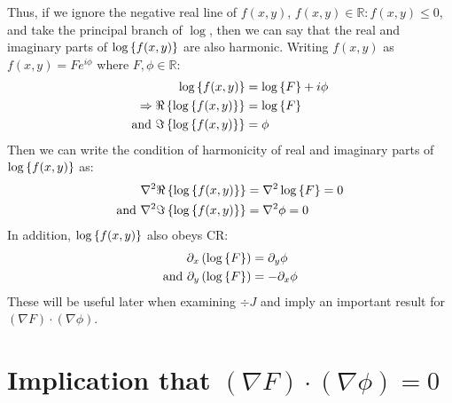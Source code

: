 \documentclass{article}
\begin{document}
Thus, if we ignore the negative real line of $f(x,y)$, $f(x,y) \in \mathbb{R} :
f(x,y) \leq 0$, and take the principal branch of $\log$, then we can say that
the real and imaginary parts of $\log \left\{ f(x,y) \right\}$ are also harmonic. Writing
$f(x,y)$ as $f(x,y) = F e^{i \phi}$ where $F, \phi \in \mathbb{R}$:
\begin{align}
    \log \left\{ f(x,y) \right\} &= \log \left\{ F \right\} + i \phi \\
    \Rightarrow \Re \left\{ \log \left\{ f(x,y) \right\} \right\} &= \log \left\{ F \right\} \\
    \textrm{and} ~ \Im \left\{ \log \left\{ f(x,y) \right\} \right\} &= \phi
\end{align}
Then we can write the condition of harmonicity of real and imaginary parts of
$\log \left\{ f(x,y) \right\}$ as:
\begin{align}
    \nabla^2 \Re \left\{ \log \left\{ f(x,y) \right\} \right\} &= \nabla^2 \log \left\{ F \right\} = 0 \\
    \textrm{and} ~ \nabla^2 \Im \left\{ \log \left\{ f(x,y) \right\} \right\} &= \nabla^2 \phi = 0
\end{align}
In addition, $\log \left\{ f(x,y) \right\}$ also obeys CR:
\begin{align}
    \partial_x \left( \log \left\{ F \right\} \right) &= \partial_y \phi \\
    \textrm{and}~ \partial_y \left( \log \left\{ F \right\} \right) &= - \partial_x \phi
\end{align}
These will be useful later when examining $\div{J}$ and imply an important
result for $\left(\nabla F\right) \cdot \left(\nabla \phi\right)$.

\section{Implication that $\left(\nabla F\right) \cdot \left( \nabla \phi \right) = 0$}
\end{document}
